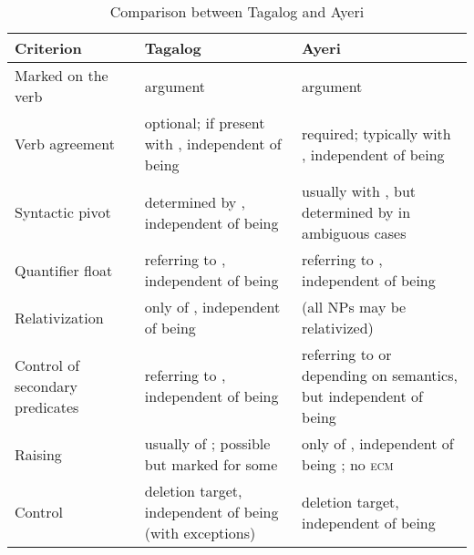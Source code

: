 \begin{table} \centering
\caption[Comparison between Tagalog and Ayeri]{Comparison between Tagalog
\citep{kroeger1991} and Ayeri}
\begin{tabu} to 
\toprule\tableheaderfont
Criterion
	& Tagalog
	& Ayeri
	\\

\toprule

Marked on the verb
	& \Nom{} argument
	& \Top{} argument
	\\

\midrule

Verb agreement
	& optional; if present with \Nom{}, independent of being \Aarg{}
	& required; typically with \Aarg{}, independent of being \Top{}
	\\

\midrule

Syntactic pivot
	& determined by \Nom{}, independent of being \Aarg{}
	& usually with \Aarg{}, but determined by \Top{} in ambiguous cases
	\\

\midrule

Quantifier float
	& referring to \Nom{}, independent of being \Aarg{}
	& referring to \Aarg{}, independent of being \Top{}
	\\

\midrule

Relativization
	& only of \Nom{}, independent of being \Aarg{}
	& (all NPs may be relativized)
	\\

\midrule

Control of secondary predicates
	& referring to \Nom{}, independent of being \Aarg{}
	& referring to \Aarg{} or \Parg{} depending on semantics, but 
		independent of being \Top{}
	\\

\midrule

Raising
	& usually of \Nom{}; \Aarg{} possible but marked for some
	& only of \Aarg{}, independent of being \Top{}; no \textsc{ecm}
	\\

\midrule

Control
	& \Aarg{} deletion target, independent of being \Nom{} (with exceptions)
	& \Aarg{} deletion target, independent of being \Top{}
	\\

\bottomrule
\end{tabu}
\label{tab:tagayrcomp}
\end{table}

